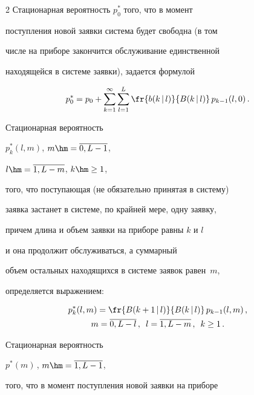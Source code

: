 \begin{multicols}{2}
Стационарная вероятность $p^*_{0}$ того, что в момент


поступления новой заявки система будет свободна (в том


числе на приборе закончится обслуживание единственной


находящейся в сис\-те\-ме заявки), задается формулой


\begin{equation*}


p^*_{0} = p_0 + \sum\limits_{k=1}^\infty \sum\limits_{l=1}^{L}


\fr{b(k\,|\,l)}{ B(k\,|\,l)} \, p_{k-1}(l,0) \,.


\end{equation*}





Стационарная вероятность


$p^*_{k}(l,m)$, $m\hm= \overline{0,L-1}$,


$l\hm= \overline{1,L-m}$, $k\hm\ge 1$,


того, что поступающая (не обязательно принятая в сис\-те\-му)


заявка застанет в сис\-те\-ме, по крайней мере, одну заявку,


причем длина и объем заявки на приборе равны $k$ и $l$


и она продолжит обслуживаться, а суммарный


объем остальных находящихся в сис\-те\-ме заявок равен~$m$,


определяется выражением:


\begin{multline*}


p^*_{k}(l,m)= \fr{B(k+1\,|\,l)}{B(k\,|\,l)}


\, p_{k-1}(l,m)\,,\\


m= \overline{0,L-l}\,,


\enskip


 l= \overline{1,L-m}\,,


\enskip  k\ge 1\,.


\end{multline*}





Стационарная вероятность


$p^*(m)$\,, $m\hm= \overline{1,L-1}$,


того, что в момент поступления новой заявки на приборе



\end{multicols}
